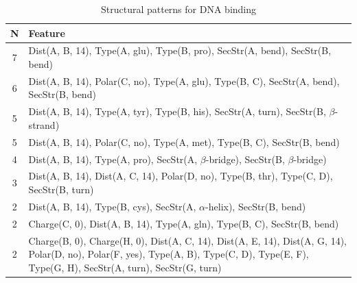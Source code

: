 \documentclass[11pt,twoside,a4paper]{book}
\begin{document}
\begin{table}\begin{tabularx}{\textwidth}{cX}\textbf{N} & \textbf{Feature} \\ \hline  
7 & Dist(A, B, 14),  Type(A, glu), Type(B, pro), SecStr(A, bend), SecStr(B, bend)\\ \hline 
6 & Dist(A, B, 14), Polar(C, no),  Type(A, glu), Type(B, C), SecStr(A, bend), \newline SecStr(B, bend)\\ \hline 
5 & Dist(A, B, 14),  Type(A, tyr), Type(B, his), SecStr(A, turn), SecStr(B, $\beta$-strand)\\ \hline 
5 & Dist(A, B, 14), Polar(C, no),  Type(A, met), Type(B, C), SecStr(B, bend)\\ \hline 
4 & Dist(A, B, 14),  Type(A, pro), SecStr(A, $\beta$-bridge), SecStr(B, $\beta$-bridge)\\ \hline 
3 & Dist(A, B, 14), Dist(A, C, 14), Polar(D, no),  Type(B, thr), Type(C, D), \newline SecStr(B, turn)\\ \hline 
2 & Dist(A, B, 14),  Type(B, cys), SecStr(A, $\alpha$-helix), SecStr(B, bend)\\ \hline 
2 & Charge(C, 0), Dist(A, B, 14),  Type(A, gln), Type(B, C), SecStr(B, bend)\\ \hline 
2 & Charge(B, 0), Charge(H, 0), Dist(A, C, 14), Dist(A, E, 14), Dist(A, G, 14), \newline Polar(D, no), Polar(F, yes),  Type(A, B), Type(C, D), Type(E, F), Type(G, H), \newline SecStr(A, turn), SecStr(G, turn)\\ \hline 
 \end{tabularx}\caption{Structural patterns for DNA binding}\label{tab:DNA_binding}\end{table}
\end{document}
